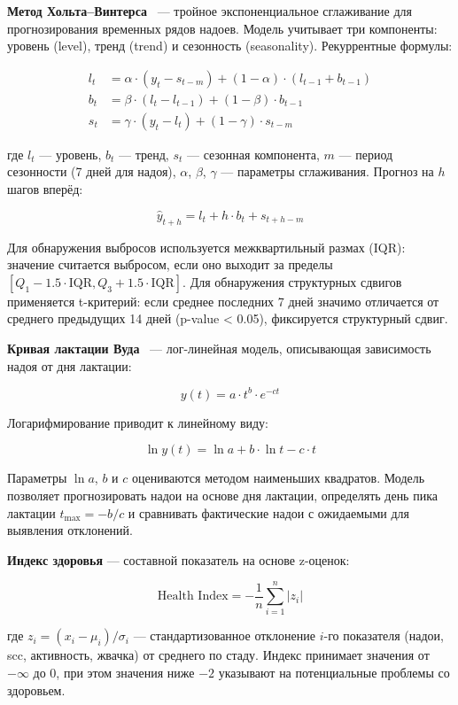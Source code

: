 \textbf{Метод Хольта--Винтерса}~\cite{HoltWinters} --- тройное экспоненциальное сглаживание для прогнозирования временных рядов надоев. Модель учитывает три компоненты: уровень (level), тренд (trend) и сезонность (seasonality). Рекуррентные формулы:

\begin{align}
l_t &= \alpha \cdot (y_t - s_{t-m}) + (1 - \alpha) \cdot (l_{t-1} + b_{t-1}) \\
b_t &= \beta \cdot (l_t - l_{t-1}) + (1 - \beta) \cdot b_{t-1} \\
s_t &= \gamma \cdot (y_t - l_t) + (1 - \gamma) \cdot s_{t-m}
\end{align}

где $l_t$ --- уровень, $b_t$ --- тренд, $s_t$ --- сезонная компонента, $m$ --- период сезонности (7 дней для надоя), $\alpha$, $\beta$, $\gamma$ --- параметры сглаживания. Прогноз на $h$ шагов вперёд:

$$\hat{y}_{t+h} = l_t + h \cdot b_t + s_{t+h-m}$$

Для обнаружения выбросов используется межквартильный размах (IQR): значение считается выбросом, если оно выходит за пределы $[Q_1 - 1.5 \cdot \text{IQR}, Q_3 + 1.5 \cdot \text{IQR}]$. Для обнаружения структурных сдвигов применяется t-критерий: если среднее последних 7 дней значимо отличается от среднего предыдущих 14 дней (p-value < 0.05), фиксируется структурный сдвиг.

\textbf{Кривая лактации Вуда}~\cite{LactationWood} --- лог-линейная модель, описывающая зависимость надоя от дня лактации:

$$y(t) = a \cdot t^b \cdot e^{-ct}$$

Логарифмирование приводит к линейному виду:

$$\ln y(t) = \ln a + b \cdot \ln t - c \cdot t$$

Параметры $\ln a$, $b$ и $c$ оцениваются методом наименьших квадратов. Модель позволяет прогнозировать надои на основе дня лактации, определять день пика лактации $t_{\max} = -b/c$ и сравнивать фактические надои с ожидаемыми для выявления отклонений.

\textbf{Индекс здоровья} --- составной показатель на основе z-оценок:

$$\text{Health Index} = -\frac{1}{n} \sum_{i=1}^{n} \left|z_i\right|$$

где $z_i = (x_i - \mu_i) / \sigma_i$ --- стандартизованное отклонение $i$-го показателя (надои, \acrshort{scc}, активность, жвачка) от среднего по стаду. Индекс принимает значения от $-\infty$ до 0, при этом значения ниже $-2$ указывают на потенциальные проблемы со здоровьем.

